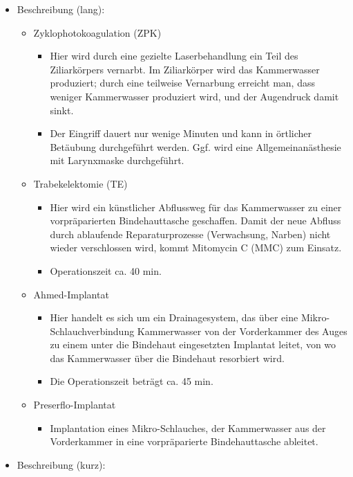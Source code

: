 \documentclass[
]{book}
\providecommand{\tightlist}{%
  \setlength{\itemsep}{0pt}\setlength{\parskip}{0pt}}
\begin{document}
\begin{itemize}
\tightlist
\item
  Beschreibung (lang):

  \begin{itemize}
  \tightlist
  \item
    Zyklophotokoagulation (ZPK)

    \begin{itemize}
    \tightlist
    \item
      Hier wird durch eine gezielte Laserbehandlung ein Teil des Ziliarkörpers vernarbt. Im Ziliarkörper wird das Kammerwasser produziert; durch eine teilweise Vernarbung erreicht man, dass weniger Kammerwasser produziert wird, und der Augendruck damit sinkt.
    \item
      Der Eingriff dauert nur wenige Minuten und kann in örtlicher Betäubung durchgeführt werden. Ggf. wird eine Allgemeinanästhesie mit Larynxmaske durchgeführt.
    \end{itemize}
  \item
    Trabekelektomie (TE)

    \begin{itemize}
    \tightlist
    \item
      Hier wird ein künstlicher Abflussweg für das Kammerwasser zu einer vorpräparierten Bindehauttasche geschaffen. Damit der neue Abfluss durch ablaufende Reparaturprozesse (Verwachsung, Narben) nicht wieder verschlossen wird, kommt Mitomycin C (MMC) zum Einsatz.
    \item
      Operationszeit ca. 40 min.
    \end{itemize}
  \item
    Ahmed-Implantat

    \begin{itemize}
    \tightlist
    \item
      Hier handelt es sich um ein Drainagesystem, das über eine Mikro-Schlauchverbindung Kammerwasser von der Vorderkammer des Auges zu einem unter die Bindehaut eingesetzten Implantat leitet, von wo das Kammerwasser über die Bindehaut resorbiert wird.
    \item
      Die Operationszeit beträgt ca. 45 min.
    \end{itemize}
  \item
    Preserflo-Implantat

    \begin{itemize}
    \tightlist
    \item
      Implantation eines Mikro-Schlauches, der Kammerwasser aus der Vorderkammer in eine vorpräparierte Bindehauttasche ableitet.
    \end{itemize}
  \end{itemize}
\item
  Beschreibung (kurz):


\end{itemize}
\end{document}
